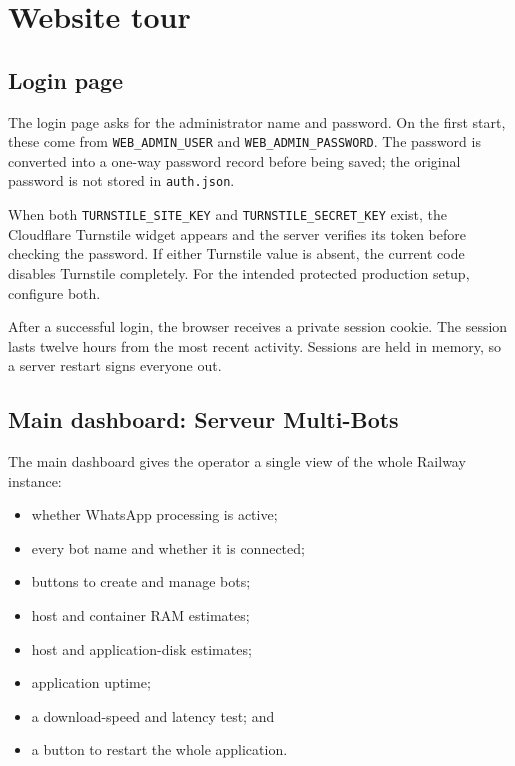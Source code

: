 \documentclass[11pt,a4paper]{article}
\begin{document}
\section{Website tour}

\subsection{Login page}

The login page asks for the administrator name and password. On the first start, these come from \texttt{WEB\_ADMIN\_USER} and \texttt{WEB\_ADMIN\_PASSWORD}. The password is converted into a one-way password record before being saved; the original password is not stored in \texttt{auth.json}.

When both \texttt{TURNSTILE\_SITE\_KEY} and \texttt{TURNSTILE\_SECRET\_KEY} exist, the Cloudflare Turnstile widget appears and the server verifies its token before checking the password. If either Turnstile value is absent, the current code disables Turnstile completely. For the intended protected production setup, configure both.

After a successful login, the browser receives a private session cookie. The session lasts twelve hours from the most recent activity. Sessions are held in memory, so a server restart signs everyone out.

\subsection{Main dashboard: Serveur Multi-Bots}

The main dashboard gives the operator a single view of the whole Railway instance:

\begin{itemize}
  \item whether WhatsApp processing is active;
  \item every bot name and whether it is connected;
  \item buttons to create and manage bots;
  \item host and container RAM estimates;
  \item host and application-disk estimates;
  \item application uptime;
  \item a download-speed and latency test; and
  \item a button to restart the whole application.
\end{itemize}
\end{document}
